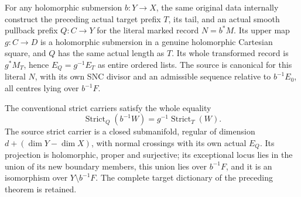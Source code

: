 \begin{theorem}
\label{hir:original-pure-boundary-prefix-smooth-comparison}
\leanok
For any holomorphic submersion $b:Y\to X$, the same original data
internally construct the preceding actual target prefix $T$, its tail,
and an actual smooth pullback prefix $Q:C\to Y$ for the literal marked
record $N=b^*M$.  Its upper map $g:C\to D$ is a holomorphic submersion
in a genuine holomorphic Cartesian square, and $Q$ has the same actual
length as $T$.  Its whole transformed record is $g^*M_T$, hence
$E_Q=g^{-1}E_T$ as entire ordered lists.  The source is canonical for
this literal $N$, with its own SNC divisor and an admissible sequence
relative to $b^{-1}E_0$, all centres lying over $b^{-1}F$.

The conventional strict carriers satisfy the whole equality
\[
 \operatorname{Strict}_{Q}(b^{-1}W)=g^{-1}\operatorname{Strict}_{T}(W).
\]
The source strict carrier is a closed submanifold, regular of dimension
$d+(\dim Y-\dim X)$, with normal crossings with its own actual $E_Q$.
Its projection is holomorphic, proper and surjective; its exceptional
locus lies in the union of its new boundary members, this union lies
over $b^{-1}F$, and it is an isomorphism over $Y\setminus b^{-1}F$.
The complete target dictionary of the preceding theorem is retained.
\end{theorem}
